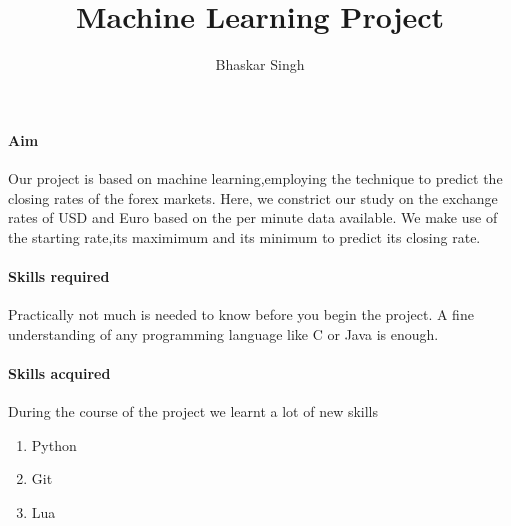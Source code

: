\documentclass{article}
\title{Machine Learning Project}
\author{Bhaskar Singh}
\begin{document}
 
\begin{titlepage}
\maketitle
\end{titlepage}

\paragraph{Aim}
Our project is based on machine learning,employing the technique to predict the closing rates of the forex markets. Here, we constrict our study on the exchange rates of USD and Euro based on the per minute data available. We make use of the starting rate,its maximimum and its minimum to predict its closing rate.

\paragraph{Skills required}
Practically not much is needed to know before you begin the project. A fine understanding of any programming language like C or Java is enough.

\paragraph{Skills acquired}
During the course of the project we learnt a lot of new skills
	\begin{enumerate}
		\item Python
		\item Git
		\item Lua
	\end{enumerate}
\newpage
\end{document}
